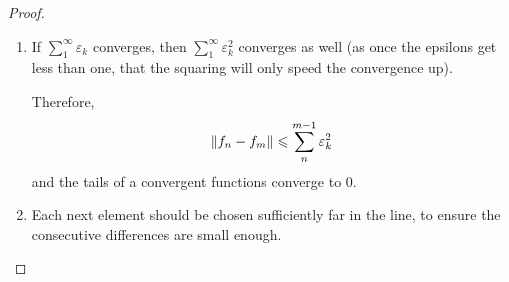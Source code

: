 \begin{proof}
    \begin{enumerate}
        \item {
            If $\sum_1^\infty \varepsilon_k$ converges, then
            $\sum_1^\infty \varepsilon_k^2$ converges as well
            (as once the epsilons get less than one, that the squaring will only
            speed the convergence up).

            Therefore,
            \[
                \lVert f_n - f_m\rVert \leqslant \sum_n^{m - 1} \varepsilon_k^2
            \]
            and the tails of a convergent functions converge to 0.
        }
        \item {
            Each next element should be chosen sufficiently far in the line, 
            to ensure the consecutive differences are small enough.
        }
    \end{enumerate}
\end{proof}

